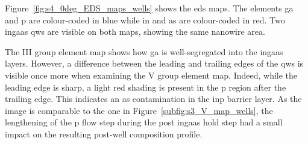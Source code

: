 Figure~\ref{fig:s4_0deg_EDS_maps_wells} shows the \acs{eds} maps. The elements \acl{ga} and \acl{p} are colour-coded in blue while \acl{in} and \acl{as} are colour-coded in red. Two \acs{ingaas} \acl{qw}s are visible on both maps, showing the same nanowire area. 

The III group element map shows how \acl{ga} is well-segregated into the \acs{ingaas} layers. However, a difference between the leading and trailing edges of the \acl{qw}s is visible once more when examining the V group element map. Indeed, while the leading edge is sharp, a light red shading is present in the \acl{p} region after the trailing edge. This indicates an \acl{as} contamination in the \acs{inp} barrier layer. As the image is comparable to the one in Figure~\ref{subfig:s3_V_map_wells}, the lengthening of the \acl{p} flow step during the post \acs{ingaas} hold step had a small impact on the resulting post-well composition profile.


